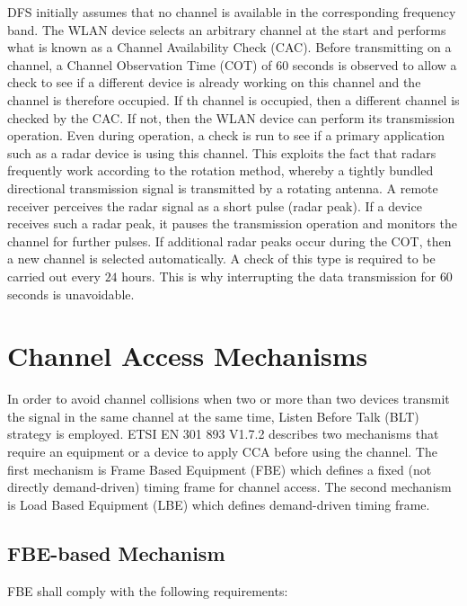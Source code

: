 DFS initially assumes that no channel is available in the corresponding frequency band. The WLAN device selects an arbitrary channel at the start and performs what is known as a Channel Availability Check (CAC). Before transmitting on a channel, a Channel Observation Time (COT) of $60$ seconds is observed to allow a check to see if a different device is already working on this channel and the channel is therefore occupied. If th channel is occupied, then a different channel is checked by the CAC. If not, then the WLAN device can perform its transmission operation. Even during operation, a check is run to see if a primary application such as a radar device is using this channel. This exploits the fact that radars frequently work according to the rotation method, whereby a tightly bundled directional transmission signal is transmitted by a rotating antenna. A remote receiver perceives the radar signal as a short pulse (radar peak). If a device receives such a radar peak, it pauses the transmission operation and monitors the channel for further pulses. If additional radar peaks occur during the COT, then a new channel is selected automatically. A check of this type is required to be carried out every $24$ hours. This is why interrupting the data transmission for $60$ seconds is unavoidable. 


\section{Channel Access Mechanisms}
\label{subsec:ETSI-overview}

In order to avoid channel collisions when two or more than two devices transmit the signal in the same channel at the same time, Listen Before Talk (BLT) strategy is employed. ETSI EN 301 893 V1.7.2 \cite{LBT-ETSI-2014} describes two mechanisms that require an equipment or a device to apply CCA before using the channel. The first mechanism is Frame Based Equipment (FBE) which defines a fixed (not directly demand-driven) timing frame for channel access. The second mechanism is Load Based Equipment (LBE) which defines demand-driven timing frame.

\subsection{FBE-based Mechanism}
\label{etsi-lbt:fbe}

FBE shall comply with the following requirements:

